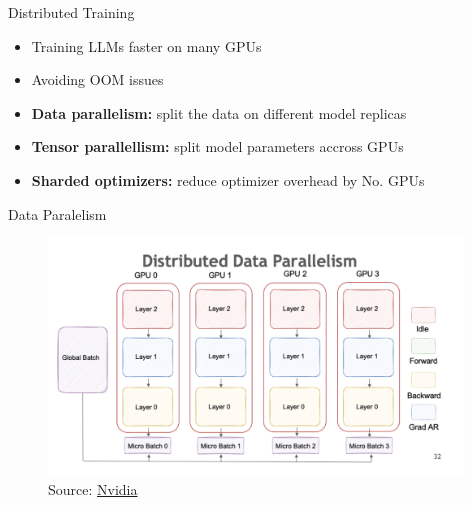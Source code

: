 
\begin{vbframe}{Distributed Training}

\vfill

\begin{itemize}
 	\item Training LLMs faster on many GPUs
 	\item Avoiding OOM issues
	\item \textbf{Data parallelism:} split the data on different model replicas
	\item \textbf{Tensor parallellism:} split model parameters accross GPUs
	\item \textbf{Sharded optimizers:} reduce optimizer overhead by No. GPUs
\end{itemize}

\vfill

\end{vbframe}


\begin{vbframe}{Data Paralelism}

\vfill

\begin{figure}
	\centering
	\includegraphics[width = 11cm]{./figure/data_parallel.png} \\ 
	{\footnotesize Source: \href{https://docs.nvidia.com/deeplearning/nemo/user-guide/docs/en/stable/nlp/nemo_megatron/parallelisms.html}{Nvidia}}
\end{figure}

\vfill

\end{vbframe}

